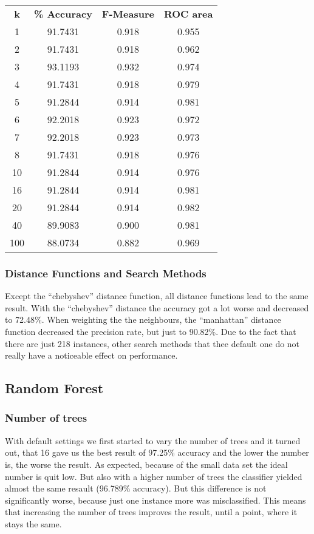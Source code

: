 \documentclass{article}
\begin{document}
 \begin{center}
\begin{tabular}{ c | c | c | c }
\textbf{k} & \textbf{\% Accuracy} & \textbf{F-Measure} & \textbf{ROC area} \\
1 & 91.7431 & 0.918 & 0.955 \\
2 & 91.7431 & 0.918 & 0.962 \\
3 & 93.1193 & 0.932 & 0.974 \\
4 & 91.7431 & 0.918 & 0.979 \\
5 & 91.2844 & 0.914 & 0.981 \\
6 & 92.2018 & 0.923 & 0.972 \\
7 & 92.2018 & 0.923 & 0.973 \\
8 & 91.7431 & 0.918 & 0.976 \\
10 & 91.2844 & 0.914 & 0.976 \\
16 & 91.2844 & 0.914 & 0.981 \\
20 & 91.2844 & 0.914 & 0.982 \\
40 & 89.9083 & 0.900 & 0.981 \\
100 & 88.0734 & 0.882 & 0.969 \\
\end{tabular}
\end{center}
 
\subsubsection{Distance Functions and Search Methods}
 
Except the “chebyshev” distance function, all distance functions lead to the same result. With the “chebyshev” distance the accuracy got a lot worse and decreased to 72.48\%. When weighting the the neighbours, the “manhattan” distance function decreased the precision rate, but just to 90.82\%. Due to the fact that there are just 218 instances, other search methods that thee default one do not really have a noticeable effect on performance.
 
\subsection{Random Forest}
 
\subsubsection{Number of trees}
 
With default settings we first started to vary the number of trees and it turned out, that 16 gave us the best result of 97.25\% accuracy and the lower the number is, the worse the result. As expected, because of the small data set the ideal number is quit low. But also with a higher number of trees the classifier yielded almost the same resault (96.789\% accuracy). But this difference is not significantly worse, because just one instance more was misclassified. This means that increasing the number of trees improves the result, until a point, where it stays the same.
 
\end{document}

